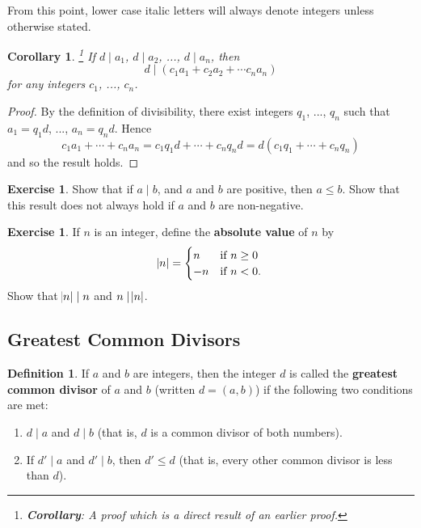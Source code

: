 \documentclass[a4paper,leqno]{article}
\numberwithin{equation}{section}
\newtheorem{cor}[equation]{Corollary}
\theoremstyle{definition}
\newtheorem{defn}[equation]{Definition}
\newtheorem{exercise}[equation]{Exercise}
\theoremstyle{remark}
\newcommand{\df}[1]{\textbf{#1}}
\begin{document}
From this point, lower case italic letters will always denote integers unless otherwise stated.

\begin{cor}\footnote{\df{Corollary}: A proof which is a direct result of an earlier proof.}
  If $ d \mid a_1 $, $ d \mid a_2 $, ..., $ d \mid a_n $, then
  \begin{displaymath}
    d \mid (c_1 a_1 + c_2 a_2 + \cdots c_n a_n)
  \end{displaymath}
  for any integers $ c_1 $, ..., $ c_n $.
\end{cor}
\begin{proof}
  By the definition of divisibility, there exist integers $ q_1 $, ..., $ q_n $ such that $ a_1 = q_1 d$, ..., $ a_n = q_n d $. Hence
  \begin{displaymath}
    c_1 a_1 + \cdots + c_n a_n = c_1 q_1 d + \cdots + c_n q_n d = d(c_1 q_1 + \cdots + c_n q_n)
  \end{displaymath}
  and so the result holds.
\end{proof}

\begin{exercise}
  Show that if $ a \mid b $, and $ a $ and $ b $ are positive, then $ a \leq b $. Show that this result
  does not always hold if $ a $ and $ b $ are non-negative.
\end{exercise}

\begin{exercise}
  If $ n $ is an integer, define the \df{absolute value} of $ n $ by
  \begin{displaymath}
    \abs{n} = \begin{cases}
                n & \text{if } n \geq 0\\
                -n & \text{if } n < 0.
              \end{cases}
  \end{displaymath}
  Show that $ \abs{n} \mid n $ and $ n \mid \abs{n} $.
\end{exercise}

\subsection{Greatest Common Divisors}
\begin{defn}
  If $ a $ and $ b $ are integers, then the integer $ d $ is called the \df{greatest common divisor} of $ a $ and $ b $ (written $ d = (a,b) $)
  if the following two conditions are met:
  \begin{enumerate}
    \item $ d \mid a $ and $ d \mid b $ (that is, $ d $ is a common divisor of both numbers).
    \item If $ d' \mid a $ and $ d' \mid b $, then $ d' \leq d $ (that is, every other common divisor is less than $ d $).
  \end{enumerate}
\end{defn}
\end{document}
